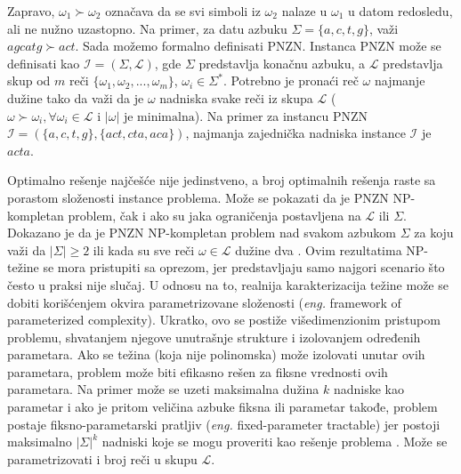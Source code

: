\documentclass[12pt,oneside]{memoir}
\begin{document}
Zapravo, $\omega_{1}\succ\omega_{2}$ označava da se svi simboli iz $\omega_{2}$ nalaze u $\omega_{1}$ u datom redosledu,
ali ne nužno uzastopno. Na primer, za datu azbuku $\Sigma=\{a,c,t,g\}$, važi $agcatg \succ act$.
Sada možemo formalno definisati PNZN. Instanca PNZN može se definisati kao $\mathcal{I} =(\Sigma,\mathcal{L})$, gde 
$\Sigma$  predstavlja konačnu azbuku, a $\mathcal{L}$ predstavlja skup od $m$ reči $\{\omega_{1},\omega_{2},...,\omega_{m}\}$,
$\omega_{i}\in\Sigma^*$. Potrebno je pronaći reč $\omega$ najmanje dužine tako da važi da je $\omega$ nadniska svake reči iz
skupa $\mathcal{L}$ ($\omega\succ\omega_{i}, \forall\omega_{i}\in\mathcal{L} \textrm{ i } |\omega| \textrm{ je minimalna}$).
Na primer za instancu PNZN $\mathcal{I}=(\{a,c,t,g\},\{act,cta,aca\})$, najmanja zajednička nadniska
instance $\mathcal{I}$ je $acta$.

Optimalno rešenje najčešće nije jedinstveno, a broj optimalnih rešenja
raste sa porastom složenosti instance problema.
Može se pokazati da je PNZN NP-kompletan problem, čak i ako su jaka ograničenja postavljena na $\mathcal{L}$ ili $\Sigma$. 
Dokazano je da je PNZN NP-kompletan problem nad svakom azbukom $\Sigma$ za koju važi da $|\Sigma|\geqslant2$ \cite{NPComplete}
ili kada su sve reči $\omega \in \mathcal{L}$ dužine dva \cite{SCSNP}. Ovim rezultatima NP-težine se mora
pristupiti sa oprezom, jer predstavljaju samo najgori scenario što često u praksi nije slučaj. U odnosu na to,
realnija karakterizacija težine može se dobiti korišćenjem okvira parametrizovane složenosti (\textit{eng.} framework of parameterized
complexity). Ukratko, ovo se postiže višedimenzionim pristupom problemu, shvatanjem njegove unutrašnje strukture i izolovanjem
određenih parametara. Ako se težina (koja nije polinomska) može izolovati unutar ovih parametara, problem može biti
efikasno rešen za fiksne vrednosti ovih parametara. Na primer može se uzeti
maksimalna dužina $k$ nadniske kao parametar i ako je pritom veličina azbuke fiksna ili parametar takođe, problem postaje
fiksno-parametarski pratljiv (\textit{eng.} fixed-parameter tractable) jer postoji maksimalno $|\Sigma|^{k}$ nadniski
koje se mogu proveriti kao rešenje problema \cite{ProbabilisticBS}. Može se parametrizovati i broj reči u skupu $\mathcal{L}$.
\end{document}

